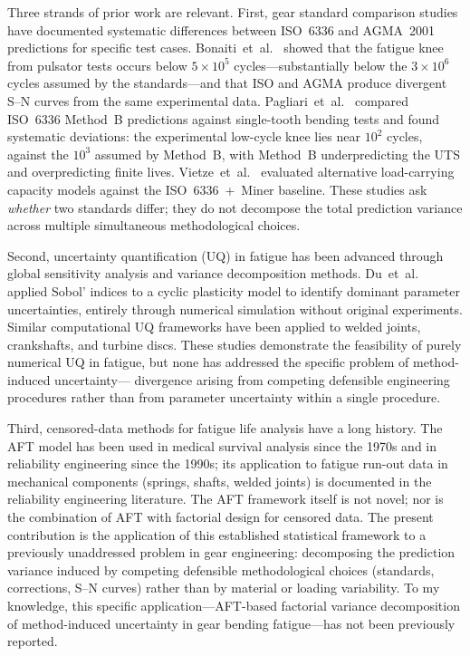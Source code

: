 \documentclass[twocolumn,12pt,a4paper]{article}
\begin{document}
Three strands of prior work are relevant. First, gear standard
comparison studies have documented systematic differences between
ISO~6336 and AGMA~2001 predictions for specific test cases.
Bonaiti~et~al.~\cite{bonaiti2024} showed that the fatigue knee from
pulsator tests occurs below $5\times10^5$ cycles---substantially
below the $3\times10^6$ cycles assumed by the
standards---and that ISO and AGMA produce divergent S--N curves from
the same experimental data. Pagliari~et~al.~\cite{pagliari2025}
compared ISO~6336 Method~B predictions against single-tooth bending
tests and found systematic deviations: the experimental low-cycle knee
lies near $10^2$ cycles, against the $10^3$ assumed by Method~B, with
Method~B underpredicting the UTS and overpredicting finite lives.
Vietze~et~al.~\cite{vietze2024}
evaluated alternative load-carrying capacity models against the
ISO~6336~+~Miner baseline. These studies ask \emph{whether} two
standards differ; they do not decompose the total prediction variance
across multiple simultaneous methodological choices.

Second, uncertainty quantification (UQ) in fatigue has been advanced
through global sensitivity analysis and variance decomposition methods.
Du~et~al.~\cite{du2022} applied Sobol' indices to a cyclic plasticity
model to identify dominant parameter
uncertainties, entirely through numerical simulation without original
experiments. Similar computational UQ frameworks have been applied to
welded joints, crankshafts, and turbine discs. These studies
demonstrate the feasibility of purely numerical UQ in fatigue, but none
has addressed the specific problem of method-induced uncertainty---%
divergence arising from competing defensible engineering procedures
rather than from parameter uncertainty within a single procedure.

Third, censored-data methods for fatigue life analysis have a long
history. The AFT model has been used in medical survival analysis since
the 1970s and in reliability engineering since the 1990s; its
application to fatigue run-out data in mechanical components (springs,
shafts, welded joints) is documented in the reliability engineering
literature. The AFT framework itself is not novel; nor is the
combination of AFT with factorial design for censored data. The
present contribution is the application of this established
statistical framework to a previously unaddressed problem in gear
engineering: decomposing the prediction variance induced by competing
defensible methodological choices (standards, corrections, S--N
curves) rather than by material or loading variability. To my
knowledge, this specific application---AFT-based factorial variance
decomposition of method-induced uncertainty in gear bending
fatigue---has not been previously reported.
\end{document}
